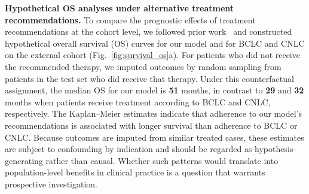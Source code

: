 \documentclass{article}
\begin{document}
\textbf{Hypothetical OS analyses under alternative treatment recommendations.}
To compare the prognostic effects of treatment recommendations at the cohort level, we followed prior work~\cite{yau2014development} and constructed hypothetical overall survival (OS) curves for our model and for BCLC and CNLC on the external cohort (Fig.~\ref{fig:survival_os}a). For patients who did not receive the recommended therapy, we imputed outcomes by random sampling from patients in the test set who did receive that therapy. Under this counterfactual assignment, the median OS for our model is \textbf{51} months, in contrast to \textbf{29} and \textbf{32} months when patients receive treatment according to BCLC and CNLC, respectively. The Kaplan–Meier estimates indicate that adherence to our model’s recommendations is associated with longer survival than adherence to BCLC or CNLC. 
Because outcomes are imputed from similar treated cases, these estimates are subject to confounding by indication and should be regarded as hypothesis-generating rather than causal. Whether such patterns would translate into population-level benefits in clinical practice is a question that warrants prospective investigation.
\end{document}

